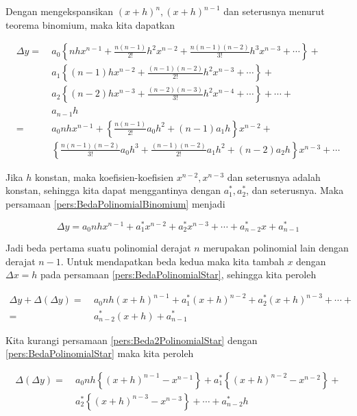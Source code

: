 Dengan mengekspansikan $(x+h)^n, (x+h)^{n-1}$ dan seterusnya menurut teorema binomium, maka kita dapatkan

\begin{equation}\label{pers:BedaPolinomialBinomium}
\begin{split}
\Delta y =~& a_0 \left\{ nhx^{n-1} + \frac{n(n-1)}{2!}h^2x^{n-2} + \frac{n(n-1)(n-2)}{3!}h^3x^{n-3} + \cdots \right\} +\\
& a_1 \left\{ (n-1)hx^{n-2} + \frac{(n-1)(n-2)}{2!}h^2x^{n-3} + \cdots \right\} +\\
& a_2 \left\{ (n-2)hx^{n-3} + \frac{(n-2)(n-3)}{3!}h^2x^{n-4} + \cdots \right\} + \cdots +\\
& a_{n-1}h\\
=~& a_0nhx^{n-1} + \left\{\frac{n(n-1)}{2!} a_0h^2 + (n-1)a_1h \right\}x^{n-2} + \\
& \left\{ \frac{n(n-1)(n-2)}{3!}a_0 h^3 + \frac{(n-1)(n-2)}{2!}a_1h^2 + (n-2)a_2h \right\} x^{n-3} + \cdots
\end{split}
\end{equation}

Jika $h$ konstan, maka koefisien-koefisien $x^{n-2}, x^{n-3}$ dan seterusnya adalah konstan, sehingga kita dapat menggantinya dengan $a_1^*, a_2^*$, dan seterusnya. Maka persamaan \ref{pers:BedaPolinomialBinomium} menjadi

\begin{equation}\label{pers:BedaPolinomialStar}
\Delta y = a_0nhx^{n-1} + a_1^*x^{n-2} + a_2^*x^{n-3} + \cdots + a_{n-2}^*x + a_{n-1}^*
\end{equation}

Jadi beda pertama suatu polinomial derajat $n$ merupakan polinomial lain dengan derajat $n-1$. Untuk mendapatkan beda kedua maka kita tambah $x$ dengan $\Delta x = h$ pada persamaan \ref{pers:BedaPolinomialStar}, sehingga kita peroleh

\begin{equation}\label{pers:Beda2PolinomialStar}
\begin{split}
\Delta y + \Delta(\Delta y) =~& a_0nh(x+h)^{n-1} + a_1^*(x+h)^{n-2} + a_2^*(x+h)^{n-3} + \cdots +\\
=~& a_{n-2}^* (x+h) + a_{n-1}^*
\end{split}
\end{equation}

Kita kurangi persamaan \ref{pers:Beda2PolinomialStar} dengan \ref{pers:BedaPolinomialStar} maka kita peroleh

\begin{equation}\label{pers:BedaBedaPoli}
\begin{split}
\Delta(\Delta y) =~& a_0nh\left\{ (x+h)^{n-1} - x^{n-1} \right\} + a_1^*\left\{ (x+h)^{n-2} - x^{n-2} \right\} + \\
& a_2^*\left\{ (x+h)^{n-3} - x^{n-3} \right\} + \cdots + a_{n-2}^*h
\end{split}
\end{equation}

